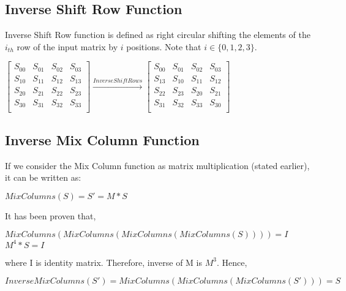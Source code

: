 \documentclass[11pt]{article}
\begin{document}
\subsection{Inverse Shift Row Function}
Inverse Shift Row function is defined as right circular shifting the elements of the $i_{th}$ row of the input matrix by $i$ positions. Note that $i \in \{0, 1, 2, 3\}$.
\begin{center}
    $
    \begin{bmatrix}
        S_{00} & S_{01} & S_{02} & S_{03}\\
        S_{10} & S_{11} & S_{12} & S_{13}\\
        S_{20} & S_{21} & S_{22} & S_{23}\\
        S_{30} & S_{31} & S_{32} & S_{33}\\
    \end{bmatrix}
    \xrightarrow{Inverse Shift Rows}
    \begin{bmatrix}
        S_{00} & S_{01} & S_{02} & S_{03}\\
        S_{13} & S_{10} & S_{11} & S_{12}\\
        S_{22} & S_{23} & S_{20} & S_{21}\\
        S_{31} & S_{32} & S_{33} & S_{30}\\
    \end{bmatrix}
    $
\end{center}

\subsection{Inverse Mix Column Function}
If we consider the Mix Column function as matrix multiplication (stated earlier), it can be written as:
\begin{center}
    $MixColumns(S) = S' = M * S$
\end{center}
It has been proven that,
\begin{center}
    $MixColumns(MixColumns(MixColumns(MixColumns(S)))) = I$\\
    \vspace{1mm}
    $M^4 * S = I$
\end{center}
where I is identity matrix. Therefore, inverse of M is $M^3$. Hence, 
\begin{center}
    $InverseMixColumns(S') = MixColumns(MixColumns(MixColumns(S'))) = S$
\end{center}
\end{document}
